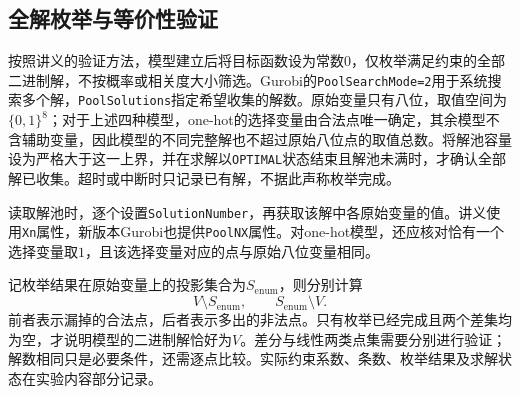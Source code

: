 




\subsection{全解枚举与等价性验证}

按照讲义的验证方法，模型建立后将目标函数设为常数$0$，仅枚举满足约束的全部二进制解，不按概率或相关度大小筛选。Gurobi的\texttt{PoolSearchMode=2}用于系统搜索多个解，\texttt{PoolSolutions}指定希望收集的解数。原始变量只有八位，取值空间为$\{0,1\}^{8}$；对于上述四种模型，one-hot的选择变量由合法点唯一确定，其余模型不含辅助变量，因此模型的不同完整解也不超过原始八位点的取值总数。将解池容量设为严格大于这一上界，并在求解以\texttt{OPTIMAL}状态结束且解池未满时，才确认全部解已收集。超时或中断时只记录已有解，不据此声称枚举完成。

读取解池时，逐个设置\texttt{SolutionNumber}，再获取该解中各原始变量的值。讲义使用\texttt{Xn}属性，新版本Gurobi也提供\texttt{PoolNX}属性。对one-hot模型，还应核对恰有一个选择变量取$1$，且该选择变量对应的点与原始八位变量相同。

记枚举结果在原始变量上的投影集合为$S_{\mathrm{enum}}$，则分别计算
\[
V\setminus S_{\mathrm{enum}},
\qquad
S_{\mathrm{enum}}\setminus V.
\]
前者表示漏掉的合法点，后者表示多出的非法点。只有枚举已经完成且两个差集均为空，才说明模型的二进制解恰好为$V$。差分与线性两类点集需要分别进行验证；解数相同只是必要条件，还需逐点比较。实际约束系数、条数、枚举结果及求解状态在实验内容部分记录。
